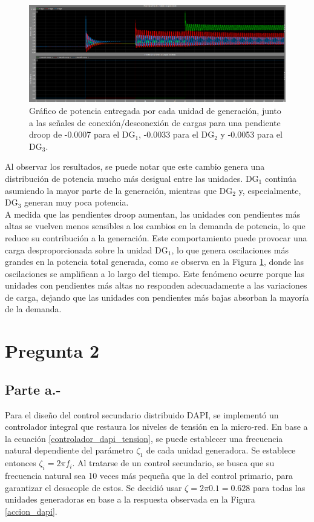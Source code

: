 \begin{figure}
    \centering
    \includegraphics[width=1.0\linewidth]{Tarea 2/report/imagenes/p1b/mp_dist_mal.png}
    \caption{Gráfico de potencia entregada por cada unidad de generación, junto a las señales de conexión/desconexión de cargas para una pendiente droop de -0.0007 para el DG$_1$, -0.0033 para el DG$_2$ y -0.0053 para el DG$_3$.}
    \label{mp_dist_mal}
\end{figure}

Al observar los resultados, se puede notar que este cambio genera una distribución de potencia mucho más desigual entre las unidades. DG$_1$ continúa asumiendo la mayor parte de la generación, mientras que DG$_2$ y, especialmente, DG$_3$ generan muy poca potencia.\\

A medida que las pendientes droop aumentan, las unidades con pendientes más altas se vuelven menos sensibles a los cambios en la demanda de potencia, lo que reduce su contribución a la generación. Este comportamiento puede provocar una carga desproporcionada sobre la unidad DG$_1$, lo que genera oscilaciones más grandes en la potencia total generada, como se observa en la Figura \ref{mp_dist_mal}, donde las oscilaciones se amplifican a lo largo del tiempo. Este fenómeno ocurre porque las unidades con pendientes más altas no responden adecuadamente a las variaciones de carga, dejando que las unidades con pendientes más bajas absorban la mayoría de la demanda.

\section{Pregunta 2}

\subsection{Parte a.-}

Para el diseño del control secundario distribuido DAPI, se implementó un controlador integral que restaura los niveles de tensión en la micro-red. En base a la ecuación \ref{controlador_dapi_tension}, se puede establecer una frecuencia natural dependiente del parámetro $\zeta_1$ de cada unidad generadora. Se establece entonces $\zeta_i = 2\pi f_{i}$. Al tratarse de un control secundario, se busca que su frecuencia natural sea 10 veces más pequeña que la del control primario, para garantizar el desacople de estos. Se decidió usar $\zeta = 2\pi 0.1 = 0.628$ para todas las unidades generadoras en base a la respuesta observada en la Figura \ref{accion_dapi}. \\

